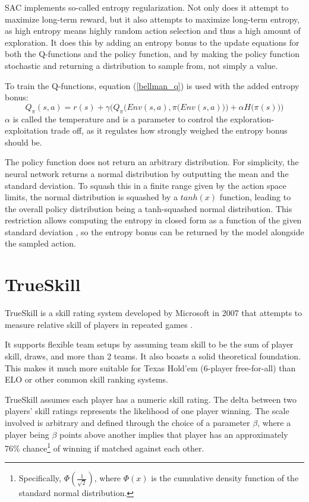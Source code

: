 SAC implements so-called entropy regularization. Not only does it attempt to maximize long-term reward, but it also attempts to maximize long-term entropy, as high entropy means highly random action selection and thus a high amount of exploration. It does this by adding an entropy bonus to the update equations for both the Q-functions and the policy function, and by making the policy function stochastic and returning a distribution to sample from, not simply a value.

To train the Q-functions, equation (\ref{bellman_q}) is used with the added entropy bonus:
\begin{equation}
    Q_{\pi}(s, a) = r(s) + \gamma \bigg(Q_{\pi}\Big(Env(s, a), \pi\big(Env(s, a)\big)\Big) + \alpha H\big(\pi(s)\big)\bigg)
\end{equation}
$\alpha$ is called the temperature and is a parameter to control the exploration-exploitation trade off, as it regulates how strongly weighed the entropy bonus should be.

The policy function does not return an arbitrary distribution. For simplicity, the neural network returns a normal distribution by outputting the mean and the standard deviation. To squash this in a finite range given by the action space limits, the normal distribution is squashed by a $tanh(x)$ function, leading to the overall policy distribution being a tanh-squashed normal distribution. This restriction allows computing the entropy in closed form as a function of the given standard deviation \cite[explained in detail in the code comments of the SpinningUp SAC implementation]{SpinningUp2018}, so the entropy bonus can be returned by the model alongside the sampled action.

\section{TrueSkill}

TrueSkill is a skill rating system developed by Microsoft in 2007 that attempts to measure relative skill of players in repeated games \cite{TrueSkill_original} \cite{TrueSkill_blog}.

It supports flexible team setups by assuming team skill to be the sum of player skill, draws, and more than 2 teams. It also boasts a solid theoretical foundation. This makes it much more suitable for Texas Hold'em (6-player free-for-all) than ELO \cite{Elo} or other common skill ranking systems.

TrueSkill assumes each player has a numeric skill rating. The delta between two players' skill ratings represents the likelihood of one player winning. The scale involved is arbitrary and defined through the choice of a parameter $\beta$, where a player being $\beta$ points above another implies that player has an approximately 76\% chance\footnote{Specifically, $\Phi\left(\frac{1}{\sqrt{2}}\right)$, where $\Phi(x)$ is the cumulative density function of the standard normal distribution.} of winning if matched against each other.

